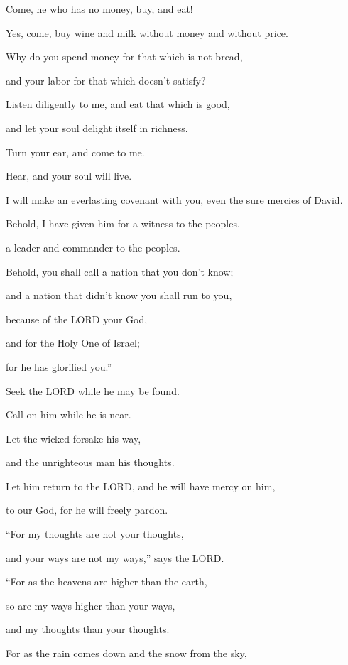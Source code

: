 \quad\quad Come, he who has no money, buy, and eat!

Yes, come, buy wine and milk without money and without price.

\myverse{}Why do you spend money for that which is not bread,

and your labor for that which doesn’t satisfy?

Listen diligently to me, and eat that which is good,

and let your soul delight itself in richness.

\myverse{}Turn your ear, and come to me.

Hear, and your soul will live.

I will make an everlasting covenant with you, even the sure mercies of David.

\myverse{}Behold, I have given him for a witness to the peoples,

a leader and commander to the peoples.

\myverse{}Behold, you shall call a nation that you don’t know;

and a nation that didn’t know you shall run to you,

because of the LORD your God,

and for the Holy One of Israel;

for he has glorified you.”


\vspace{\baselineskip} \myverse{}Seek the LORD while he may be found.

Call on him while he is near.

\myverse{}Let the wicked forsake his way,

and the unrighteous man his thoughts.

Let him return to the LORD, and he will have mercy on him,

to our God, for he will freely pardon.


\vspace{\baselineskip} \myverse{}“For my thoughts are not your thoughts,

and your ways are not my ways,” says the LORD.

\myverse{}“For as the heavens are higher than the earth,

so are my ways higher than your ways,

and my thoughts than your thoughts.

\myverse{}For as the rain comes down and the snow from the sky,

